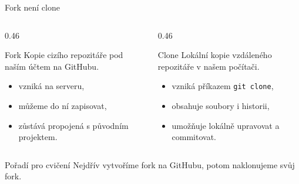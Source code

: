 \documentclass[aspectratio=169]{beamer}
\begin{document}
\begin{frame}{Fork není clone}
  \begin{columns}[T]
    \begin{column}{0.46\textwidth}
      \begin{block}{Fork}
        Kopie cizího repozitáře pod naším účtem na GitHubu.
      \end{block}
      \begin{itemize}
        \item vzniká na serveru,
        \item můžeme do ní zapisovat,
        \item zůstává propojená s původním projektem.
      \end{itemize}
    \end{column}
    \begin{column}{0.46\textwidth}
      \begin{block}{Clone}
        Lokální kopie vzdáleného repozitáře v našem počítači.
      \end{block}
      \begin{itemize}
        \item vzniká příkazem \texttt{git clone},
        \item obsahuje soubory i historii,
        \item umožňuje lokálně upravovat a commitovat.
      \end{itemize}
    \end{column}
  \end{columns}
  \begin{alertblock}{Pořadí pro cvičení}
    Nejdřív vytvoříme fork na GitHubu, potom naklonujeme svůj fork.
  \end{alertblock}
\end{frame}
\end{document}
